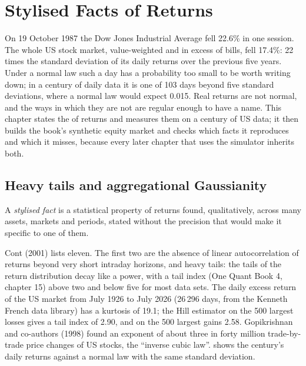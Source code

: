 \chapter{Stylised Facts of Returns}\label{ch:rs:stylised-facts-of-returns}

On 19 October 1987 the Dow Jones Industrial Average fell 22.6\% in one session. The whole US stock market, value-weighted and in
excess of bills, fell 17.4\%: 22 times the standard deviation of its daily returns over the previous five years. Under a normal law
such a day has a probability too small to be worth writing down; in a century of daily data it is one of 103 days beyond five
standard deviations, where a normal law would expect 0.015. Real returns are not normal, and the ways in which they are not are
regular enough to have a name. This chapter states the  of returns and measures them on a century of US data; it
then builds the book's synthetic equity market and checks which facts it reproduces and which it misses, because every later
chapter that uses the simulator inherits both.

\section{Heavy tails and aggregational Gaussianity}

\begin{definition}\label{def:rs:stylised-facts-of-returns:fact}
A \emph{stylised fact} is a statistical property of returns found, qualitatively, across many assets,
markets and periods, stated without the precision that would make it specific to one of them.
\end{definition}

Cont (2001) lists eleven. The first two are the absence of linear autocorrelation of returns beyond very short intraday horizons,
and heavy tails: the tails of the return distribution decay like a power, with a tail index (One Quant Book 4, chapter 15) above
two and below five for most data sets. The daily excess return of the US market from July 1926 to July 2026 (26\,296 days, from the
Kenneth French data library) has a kurtosis of 19.1; the Hill estimator on the 500 largest losses gives a tail index of 2.90, and
on the 500 largest gains 2.58. Gopikrishnan and co-authors (1998) found an exponent of about three in forty million trade-by-trade
price changes of US stocks, the ``inverse cubic law''.  shows the century's daily
returns against a normal law with the same standard deviation.

